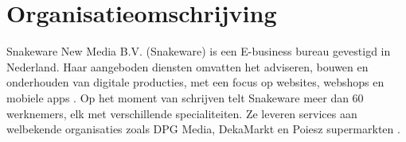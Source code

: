 \section{Organisatieomschrijving}
Snakeware New Media B.V. (Snakeware) is een E-business bureau gevestigd in Nederland.
Haar aangeboden diensten omvatten het adviseren, bouwen en onderhouden van digitale
producties, met een focus op websites, webshops en mobiele apps \Parencite{SnakewareWhatWeDo}. Op
het moment van schrijven telt Snakeware meer dan 60 werknemers, elk met verschillende
specialiteiten. Ze leveren services aan welbekende organisaties zoals DPG Media, DekaMarkt
en Poiesz supermarkten \Parencite{SnakewareCases}.

